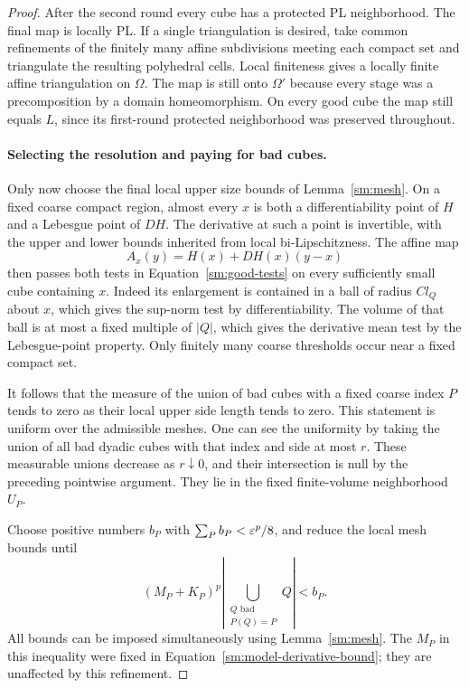 \begin{proof}
After the second round every cube has a
protected PL neighborhood.  The final map is
locally PL.  If a single triangulation is
desired, take common refinements of the
finitely many affine subdivisions meeting
each compact set and triangulate the resulting
polyhedral cells.  Local finiteness gives a
locally finite affine triangulation on
$\Omega$.  The map is still onto $\Omega'$
because every stage was a precomposition by
a domain homeomorphism.  On every good cube
the map still equals $L$, since its first-round
protected neighborhood was preserved throughout.

\paragraph{Selecting the resolution and paying for bad cubes.}
Only now choose the final local upper size
bounds of Lemma~\ref{sm:mesh}.  On a fixed
coarse compact region, almost every $x$ is
both a differentiability point of $H$ and a
Lebesgue point of $DH$.  The derivative at
such a point is invertible, with the upper
and lower bounds inherited from local
bi-Lipschitzness.  The affine map
\[
 A_x(y)=H(x)+DH(x)(y-x)
\]
then passes both tests in
Equation~\eqref{sm:good-tests} on every sufficiently
small cube containing $x$.  Indeed its
enlargement is contained in a ball of radius
$C l_Q$ about $x$, which gives the sup-norm
test by differentiability.  The volume of
that ball is at most a fixed multiple of
$|Q|$, which gives the derivative mean test
by the Lebesgue-point property.  Only
finitely many coarse thresholds occur near
a fixed compact set.

It follows that the measure of the union of
bad cubes with a fixed coarse index $P$
tends to zero as their local upper side
length tends to zero.  This statement is
uniform over the admissible meshes.  One
can see the uniformity by taking the union
of all bad dyadic cubes with that index
and side at most $r$.  These measurable
unions decrease as $r\downarrow0$, and
their intersection is null by the preceding
pointwise argument.  They lie in the fixed
finite-volume neighborhood $U_P$.

Choose positive numbers $b_P$ with
$\sum_Pb_P<\varepsilon^p/8$, and reduce the
local mesh bounds until
\begin{equation}
 \label{sm:bad-error-budget}
 (M_P+K_P)^p
 \left|\bigcup_{\substack{Q\text{ bad}\\P(Q)=P}}Q\right|
 <b_P.
\end{equation}
All bounds can be imposed simultaneously
using Lemma~\ref{sm:mesh}.  The $M_P$ in
this inequality were fixed in
Equation~\eqref{sm:model-derivative-bound}; they
are unaffected by this refinement.


\end{proof}
